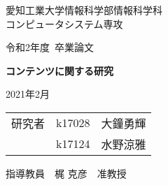 \thispagestyle{myheadings}

\vspace{-1.0cm}

\begin{center}

{\LARGE 愛知工業大学情報科学部情報科学科\\
コンピュータシステム専攻

\vspace{1.0cm}

令和2年度~卒業論文\\

\vspace{2.0cm}

{\Huge 
\baselineskip=15mm
\textbf{コンテンツに関する研究\\}}

\vspace{7.0cm}

2021年2月\\

\vspace{1.0cm}

\begin{tabular}[h]{lll}
  研究者  & k17028 & 大鐘勇輝\\
         & k17124 & 水野涼雅\\
\end{tabular}

\vspace{1.0cm}

指導教員\ \ 梶 克彦\ \ 准教授}

\end{center}